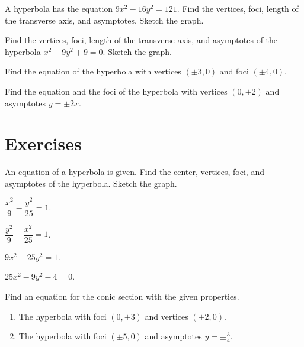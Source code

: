 \begin{example}
    A hyperbola has the equation $9x^2-16y^2=121$.
Find the vertices, foci, length of the transverse axis, and asymptotes. Sketch the graph.
\end{example}

\newpage

\begin{example}
    Find the vertices, foci, length of the transverse axis, and asymptotes of the hyperbola $x^2-9y^2+9=0$. Sketch the graph.
\end{example}

\begin{example}
    Find the equation of the hyperbola with vertices $(\pm 3, 0)$ and foci $(\pm 4, 0)$.
\end{example}

\begin{example}
Find the equation and the foci of the hyperbola with vertices $(0,\pm 2)$ and asymptotes $y=\pm2x$.
\end{example}

\newpage
\section*{Exercises}

\begin{exercise}
    An equation of a hyperbola is given. Find the center, vertices, foci, and asymptotes of the hyperbola. Sketch the graph.\\
    \begin{enumerate*}
        \item $\dfrac{x^2}{9}-\dfrac{y^2}{25}=1$.
        \item $\dfrac{y^2}{9}-\dfrac{x^2}{25}=1$.
        \item $9x^2-25y^2=1$.
        \item $25x^2-9y^2-4=0$.
    \end{enumerate*}
\end{exercise}

\begin{exercise}
Find an equation for the conic section with the given properties.
\begin{enumerate}
    \item The hyperbola with foci $(0,\pm 3)$ and vertices $(\pm 2, 0)$.
    \item The hyperbola with foci $(\pm 5, 0)$ and asymptotes $y=\pm\frac34$.
\end{enumerate}
\end{exercise}

